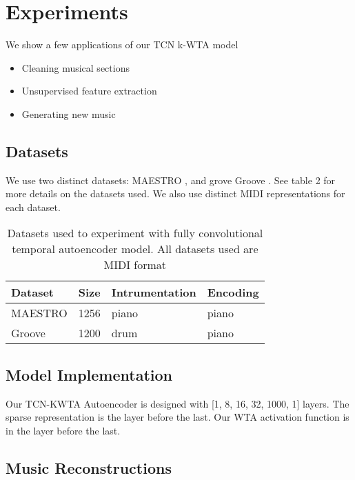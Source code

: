 \documentclass[11pt,a4paper]{article}
\begin{document}
\section{Experiments}
\label{ssec:experiments}

We show a few applications of our TCN k-WTA model

\begin{itemize}
\item Cleaning musical sections
\item Unsupervised feature extraction 
\item Generating new music
\end{itemize}


\subsection{Datasets}
\label{ssec:experiments}

We use two distinct datasets: MAESTRO  \citep{Gusfield:97}, and  grove Groove  \citep{Gusfield:97} . See table 2 for more details on the datasets used. We also use distinct MIDI representations for each dataset. 


\begin{table*}[t!]
\centering
\begin{tabular}{llll}
  Dataset & Size & Intrumentation  & Encoding \\
  \hline
  MAESTRO \citep{Gusfield:97} & 1256 & piano  & piano \\
  Groove \citet{Gusfield:97} &1200 & drum  & piano \\
\end{tabular}
\caption{Datasets used to experiment with fully convolutional temporal autoencoder model. All datasets used are MIDI format 
  }
\end{table*}



\subsection{Model Implementation}

Our TCN-KWTA Autoencoder is designed with [1, 8, 16, 32, 1000, 1] layers. The sparse representation is the layer before the last. Our WTA activation function is in the layer before the last. 

\subsection{Music Reconstructions}
\label{ssec:first}
\end{document}
